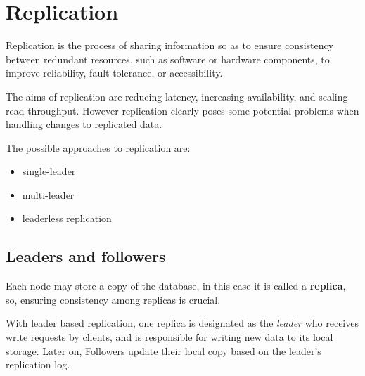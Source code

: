 \chapter{Replication}

\begin{definition}
   [Replication]
   Replication is the process of sharing information so as to ensure consistency between redundant resources, such as software or hardware components, to improve reliability, fault-tolerance, or accessibility.

\end{definition}

The aims of replication are reducing latency, increasing availability, and scaling read throughput.
However replication clearly poses some potential problems when handling changes to replicated data.
{The possible approaches to replication are:\ns
\begin{itemize}
   \item single-leader
   \item multi-leader
   \item leaderless replication
\end{itemize}}

\section{Leaders and followers}
Each node may store a copy of the database, in this case it is called a \textbf{replica}, so, ensuring consistency among replicas is crucial.



With leader based replication, one replica is designated as the \textit{leader} who receives write requests by clients, and is responsible for writing new data to its local storage.
Later on, Followers update their local copy based on the leader's
replication log.

